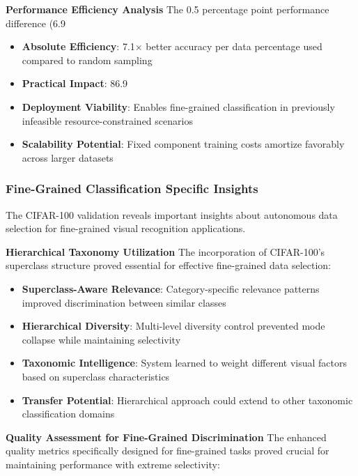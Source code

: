 \documentclass[12pt]{article}
\begin{document}
\textbf{Performance Efficiency Analysis}
The 0.5 percentage point performance difference (6.9%

\begin{itemize}
\item \textbf{Absolute Efficiency}: 7.1× better accuracy per data percentage used compared to random sampling
\item \textbf{Practical Impact}: 86.9%
\item \textbf{Deployment Viability}: Enables fine-grained classification in previously infeasible resource-constrained scenarios
\item \textbf{Scalability Potential}: Fixed component training costs amortize favorably across larger datasets
\end{itemize}

\subsubsection{Fine-Grained Classification Specific Insights}\label{fine-grained-insights}

The CIFAR-100 validation reveals important insights about autonomous data selection for fine-grained visual recognition applications.

\textbf{Hierarchical Taxonomy Utilization}
The incorporation of CIFAR-100's superclass structure proved essential for effective fine-grained data selection:

\begin{itemize}
\item \textbf{Superclass-Aware Relevance}: Category-specific relevance patterns improved discrimination between similar classes
\item \textbf{Hierarchical Diversity}: Multi-level diversity control prevented mode collapse while maintaining selectivity
\item \textbf{Taxonomic Intelligence}: System learned to weight different visual factors based on superclass characteristics
\item \textbf{Transfer Potential}: Hierarchical approach could extend to other taxonomic classification domains
\end{itemize}

\textbf{Quality Assessment for Fine-Grained Discrimination}
The enhanced quality metrics specifically designed for fine-grained tasks proved crucial for maintaining performance with extreme selectivity:
\end{document}
